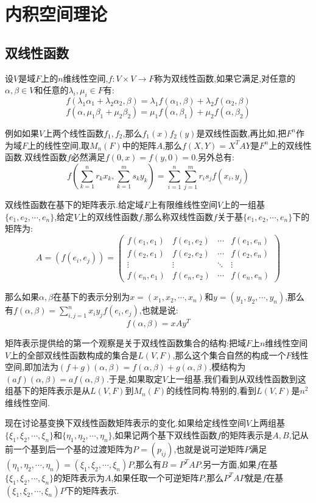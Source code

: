 \section{内积空间理论}
\subsection{双线性函数}

设$V$是域$F$上的$n$维线性空间,$f:V\times V\to F$称为双线性函数,如果它满足,对任意的$\alpha,\beta\in V$和任意的$\lambda_i,\mu_i\in F$有:
$$f(\lambda_1\alpha_1+\lambda_2\alpha_2,\beta)=\lambda_1f(\alpha_1,\beta)+\lambda_2f(\alpha_2,\beta)$$
$$f(\alpha,\mu_1\beta_1+\mu_2\beta_2)=\mu_1f(\alpha,\beta_1)+\mu_2f(\alpha,\beta_2)$$

例如如果$V$上两个线性函数$f_1,f_2$,那么$f_1(x)f_2(y)$是双线性函数,再比如,把$F^n$作为域$F$上的线性空间,取$M_n(F)$中的矩阵$A$,那么$f(X,Y)=X^TAY$是$F^n$上的双线性函数.双线性函数$f$必然满足$f(0,x)=f(y,0)=0$.另外总有:
$$f(\sum_{k=1}^{n}r_kx_k,\sum_{k=1}^{m}s_ky_k)=\sum_{i=1}^{n}\sum_{j=1}^{m}r_is_jf(x_i,y_j)$$

双线性函数在基下的矩阵表示.给定域$F$上有限维线性空间$V$上的一组基$\{e_1,e_2,\cdots,e_n\}$,给定$V$上的双线性函数$f$,那么称双线性函数$f$关于基$\{e_1,e_2,\cdots,e_n\}$下的矩阵为:
$$A=(f(e_i,e_j))=\left(\begin{array}{cccc}
f(e_1,e_1)&f(e_1,e_2)&\cdots&f(e_1,e_n)\\
f(e_2,e_1)&f(e_2,e_2)&\cdots&f(e_2,e_n)\\
\vdots&\vdots&\ddots&\vdots\\
f(e_n,e_1)&f(e_n,e_2)&\cdots&f(e_n,e_n)\end{array}\right)$$

那么如果$\alpha,\beta$在基下的表示分别为$x=(x_1,x_2,\cdots,x_n)$和$y=(y_1,y_2,\cdots,y_n)$,那么有$f(\alpha,\beta)=\sum_{i,j=1}^{n}x_iy_jf(e_i,e_j)$,也就是说:$$f(\alpha,\beta)=xAy^T$$

矩阵表示提供给的第一个观察是关于双线性函数集合的结构:把域$F$上$n$维线性空间$V$上的全部双线性函数构成的集合是$L(V,F)$,那么这个集合自然的构成一个$F$线性空间,即加法为$(f+g)(\alpha,\beta)=f(\alpha,\beta)+g(\alpha,\beta)$,模结构为$(af)(\alpha,\beta)=af(\alpha,\beta)$.于是,如果取定$V$上一组基,我们看到从双线性函数到这组基下的矩阵表示是从$L(V,F)$到$M_n(F)$的线性同构.特别的,看到$L(V,F)$是$n^2$维线性空间.

现在讨论基变换下双线性函数矩阵表示的变化.如果给定线性空间$V$上两组基$\{\xi_1,\xi_2,\cdots,\xi_n\}$和$\{\eta_1,\eta_2,\cdots,\eta_n\}$,如果记两个基下双线性函数$f$的矩阵表示是$A,B$,记从前一个基到后一个基的过渡矩阵为$P=(p_{ij})$,也就是说可逆矩阵$P$满足$(\eta_1,\eta_2,\cdots,\eta_n)=(\xi_1,\xi_2,\cdots,\xi_n)P$,那么有$B=P^TAP$.另一方面,如果$f$在基$\{\xi_1,\xi_2,\cdots,\xi_n\}$的矩阵表示为$A$,如果任取一个可逆矩阵$P$,那么$P^TAP$就是$f$在基$(\xi_1,\xi_2,\cdots,\xi_n)P$下的矩阵表示.

